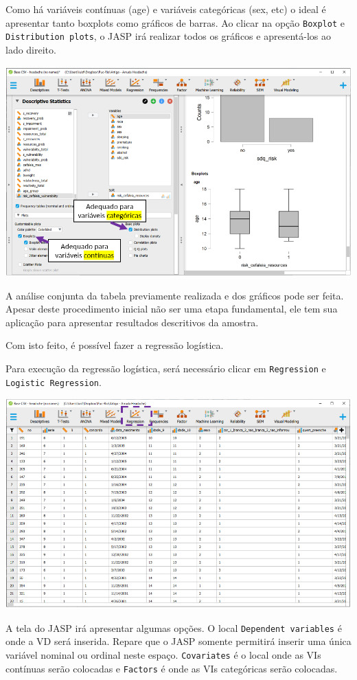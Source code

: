 \documentclass[
]{book}
\begin{document}
Como há variáveis contínuas (age) e variáveis categóricas (sex, etc) o
ideal é apresentar tanto boxplots como gráficos de barras. Ao clicar na
opção \texttt{Boxplot} e \texttt{Distribution\ plots}, o JASP irá
realizar todos os gráficos e apresentá-los ao lado direito.

\includegraphics{./img/cap_logistica_plots2.png}

A análise conjunta da tabela previamente realizada e dos gráficos pode
ser feita. Apesar deste procedimento inicial não ser uma etapa
fundamental, ele tem sua aplicação para apresentar resultados
descritivos da amostra.

Com isto feito, é possível fazer a regressão logística.

Para execução da regressão logística, será necessário clicar em
\texttt{Regression} e \texttt{Logistic\ Regression}.

\includegraphics{./img/cap_logistica_regression.png}

A tela do JASP irá apresentar algumas opções. O local
\texttt{Dependent\ variables} é onde a VD será inserida. Repare que o
JASP somente permitirá inserir uma única variável nominal ou ordinal
neste espaço. \texttt{Covariates} é o local onde as VIs contínuas serão
colocadas e \texttt{Factors} é onde as VIs categóricas serão colocadas.
\end{document}
